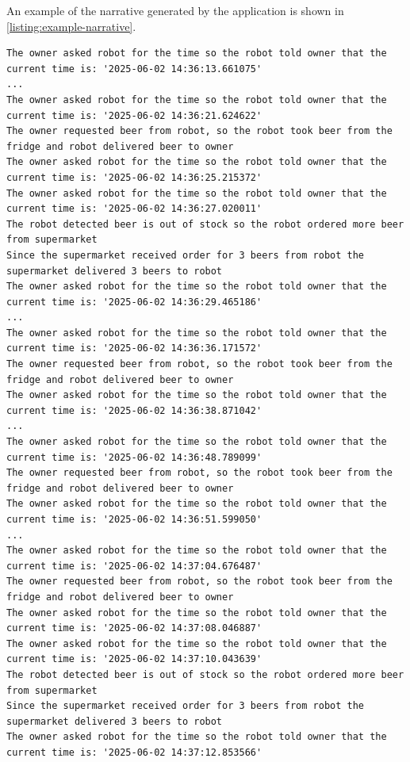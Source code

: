 \documentclass{scrartcl}
\begin{document}
An example of the narrative generated by the application is shown in \ref{listing:example-narrative}.

\begin{landscape}
\begin{listing}
\begin{verbatim}
The owner asked robot for the time so the robot told owner that the current time is: '2025-06-02 14:36:13.661075'
...
The owner asked robot for the time so the robot told owner that the current time is: '2025-06-02 14:36:21.624622'
The owner requested beer from robot, so the robot took beer from the fridge and robot delivered beer to owner 
The owner asked robot for the time so the robot told owner that the current time is: '2025-06-02 14:36:25.215372'
The owner asked robot for the time so the robot told owner that the current time is: '2025-06-02 14:36:27.020011'
The robot detected beer is out of stock so the robot ordered more beer from supermarket
Since the supermarket received order for 3 beers from robot the supermarket delivered 3 beers to robot
The owner asked robot for the time so the robot told owner that the current time is: '2025-06-02 14:36:29.465186'
...
The owner asked robot for the time so the robot told owner that the current time is: '2025-06-02 14:36:36.171572'
The owner requested beer from robot, so the robot took beer from the fridge and robot delivered beer to owner 
The owner asked robot for the time so the robot told owner that the current time is: '2025-06-02 14:36:38.871042'
...
The owner asked robot for the time so the robot told owner that the current time is: '2025-06-02 14:36:48.789099'
The owner requested beer from robot, so the robot took beer from the fridge and robot delivered beer to owner 
The owner asked robot for the time so the robot told owner that the current time is: '2025-06-02 14:36:51.599050'
...
The owner asked robot for the time so the robot told owner that the current time is: '2025-06-02 14:37:04.676487'
The owner requested beer from robot, so the robot took beer from the fridge and robot delivered beer to owner 
The owner asked robot for the time so the robot told owner that the current time is: '2025-06-02 14:37:08.046887'
The owner asked robot for the time so the robot told owner that the current time is: '2025-06-02 14:37:10.043639'
The robot detected beer is out of stock so the robot ordered more beer from supermarket
Since the supermarket received order for 3 beers from robot the supermarket delivered 3 beers to robot
The owner asked robot for the time so the robot told owner that the current time is: '2025-06-02 14:37:12.853566'

\end{verbatim}
\end{listing}
\end{landscape}
\end{document}
